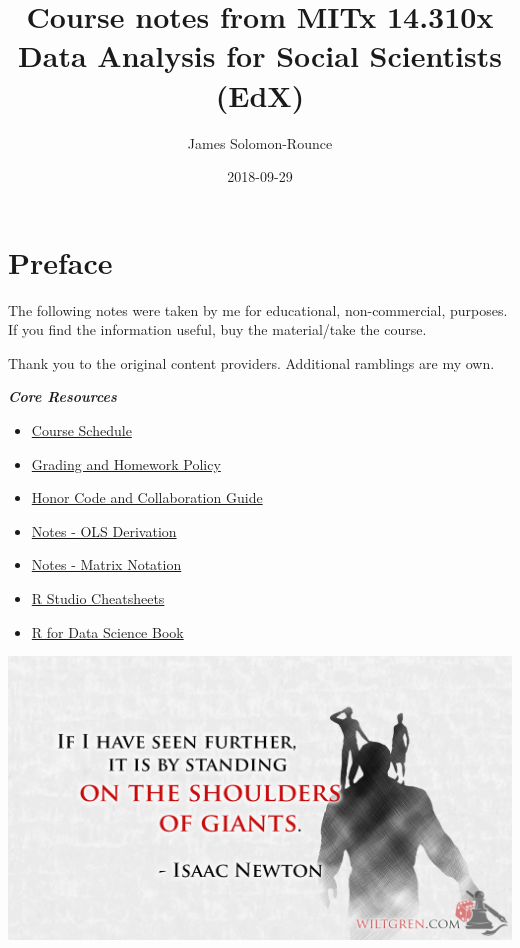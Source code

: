 \documentclass[]{book}
\title{Course notes from MITx 14.310x Data Analysis for Social Scientists (EdX)}
\author{James Solomon-Rounce}
\date{2018-09-29}
\providecommand{\tightlist}{%
  \setlength{\itemsep}{0pt}\setlength{\parskip}{0pt}}
\theoremstyle{definition}
\theoremstyle{definition}
\theoremstyle{definition}
\theoremstyle{remark}
\begin{document}
\maketitle

{
\setcounter{tocdepth}{1}
\tableofcontents
}
\chapter*{Preface}\label{preface}

The following notes were taken by me for educational, non-commercial,
purposes. If you find the information useful, buy the material/take the
course.

Thank you to the original content providers. Additional ramblings are my
own.

\textbf{\emph{Core Resources}}

\begin{itemize}
\tightlist
\item
  \href{./files/14.310x_3T2018_Schedule.pdf}{Course Schedule}
\item
  \href{./files/14.310x_Grading_and_Homework_Policy__3T2018.pdf}{Grading
  and Homework Policy}
\item
  \href{./files/14310x_Honor_Code_and_Collaboration_Guidelines.pdf}{Honor
  Code and Collaboration Guide}
\item
  \href{./files/Derivation_of_OLS_Estimators.pdf}{Notes - OLS
  Derivation}
\item
  \href{./files/Matrix_Notation_etc.pdf}{Notes - Matrix Notation}
\item
  \href{https://www.rstudio.com/resources/cheatsheets/}{R Studio
  Cheatsheets}
\item
  \href{http://r4ds.had.co.nz/index.html}{R for Data Science Book}
\end{itemize}

\includegraphics[width=1\linewidth]{images/standing}
\end{document}
